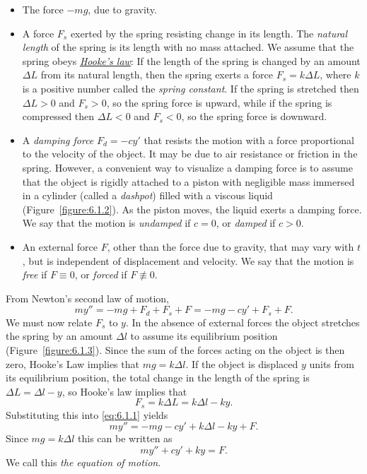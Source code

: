 \begin{itemize}
  \item The force $-mg$, due to gravity.

  \item A force $F_{s}$ exerted by the spring resisting change in its length. The {\color{blue}\it
        natural length} of the spring is its length with no mass attached. We assume that the spring
        obeys \href{https://mathshistory.st-andrews.ac.uk/Biographies/Hooke/}{\color{blue}
    \it Hooke's law}: If the length of the spring is changed by an amount $\Delta L$ from its
    natural length, then the spring exerts a force $F_{s}=k\Delta L$, where $k$ is a positive number
    called the {\color{blue}\it spring constant\/}. If the spring is stretched then $\Delta L>0$ and
    $F_{s}>0$, so the spring force is upward, while if the spring is compressed then $\Delta L<0$
    and $F_{s}<0$, so the spring force is downward.

  \item A {\color{blue}\it damping force\/} $F_{d}=-cy'$ that resists the motion with a force
        proportional to the velocity of the object. It may be due to air resistance or friction in
        the spring. However, a convenient way to visualize a damping force is to assume that the
        object is rigidly attached to a piston with negligible mass immersed in a cylinder (called a
        {\color{blue}\it dashpot\/}) filled with a viscous liquid (Figure~\ref{figure:6.1.2}). As
        the piston moves, the liquid exerts a damping force. We say that the motion is
        {\color{blue}\it undamped\/} if $c=0$, or {\color{blue}\it damped\/} if $c>0$.

  \item An external force $F$, other than the force due to gravity, that may vary with $t$, but is
        independent of displacement and velocity. We say that the motion is {\color{blue}\it free\/}
        if $F\equiv0$, or {\color{blue}\it forced\/} if $F\not\equiv0$.
\end{itemize}

From Newton's second law of motion,
\begin{equation}
  \label{eq:6.1.1}my''=-mg+F_{d}+F_{s}+F=-mg-cy'+F_{s}+F.
\end{equation}
We must now relate $F_{s}$ to $y$. In the absence of external forces the object stretches the spring
by an amount $\Delta l$ to assume its equilibrium position (Figure~\ref{figure:6.1.3}). Since the
sum of the forces acting on the object is then zero, Hooke's Law implies that $mg=k\Delta l$. If the
object is displaced $y$ units from its equilibrium position, the total change in the length of the
spring is $\Delta L=\Delta l-y$, so Hooke's law implies that
\[
  F_{s}=k\Delta L=k\Delta l-ky.
\]
Substituting this into \eqref{eq:6.1.1} yields
\[
  my''=-mg-cy'+k\Delta l-ky+F.
\]
Since $mg=k\Delta l$ this can be written as
\begin{equation}
  \label{eq:6.1.2}my''+cy'+ky=F.
\end{equation}
We call this {\color{blue}\it the equation of motion\/}.

